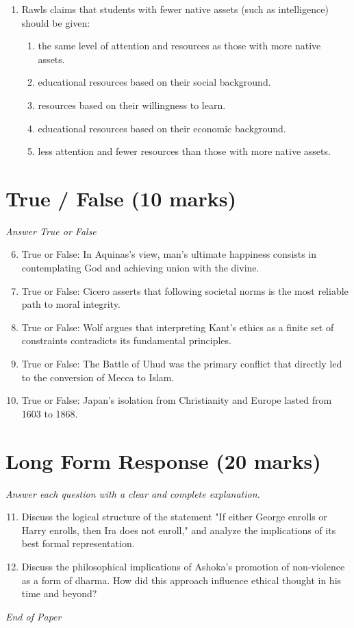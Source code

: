 \documentclass[12pt]{article}
\begin{document}
\begin{enumerate}[label=\arabic*.]
\begin{enumerate}[label=(\alph*)]
    \item the existence of the divine.
    \item the causes of good and evil.
    \item both a and b.
\end{enumerate}
\item Rawls claims that students with fewer native assets (such as intelligence) should be given:
\begin{enumerate}[label=(\alph*)]
    \item the same level of attention and resources as those with more native assets.
    \item educational resources based on their social background.
    \item resources based on their willingness to learn.
    \item educational resources based on their economic background.
    \item less attention and fewer resources than those with more native assets.
\end{enumerate}
\end{enumerate}

\section*{True / False (10 marks)}
\textit{Answer True or False}
\begin{enumerate}[label=\arabic*.]
\setcounter{enumi}{5}
\item True or False: In Aquinas's view, man's ultimate happiness consists in contemplating God and achieving union with the divine.
\item True or False: Cicero asserts that following societal norms is the most reliable path to moral integrity.
\item True or False: Wolf argues that interpreting Kant's ethics as a finite set of constraints contradicts its fundamental principles.
\item True or False: The Battle of Uhud was the primary conflict that directly led to the conversion of Mecca to Islam.
\item True or False: Japan's isolation from Christianity and Europe lasted from 1603 to 1868.
\end{enumerate}

\section*{Long Form Response (20 marks)}
\textit{Answer each question with a clear and complete explanation.}
\begin{enumerate}[label=\arabic*.]
\setcounter{enumi}{10}
\item Discuss the logical structure of the statement "If either George enrolls or Harry enrolls, then Ira does not enroll," and analyze the implications of its best formal representation.
\item Discuss the philosophical implications of Ashoka's promotion of non-violence as a form of dharma. How did this approach influence ethical thought in his time and beyond?
\end{enumerate}

\vfill
\noindent\textit{End of Paper}
\end{document}
